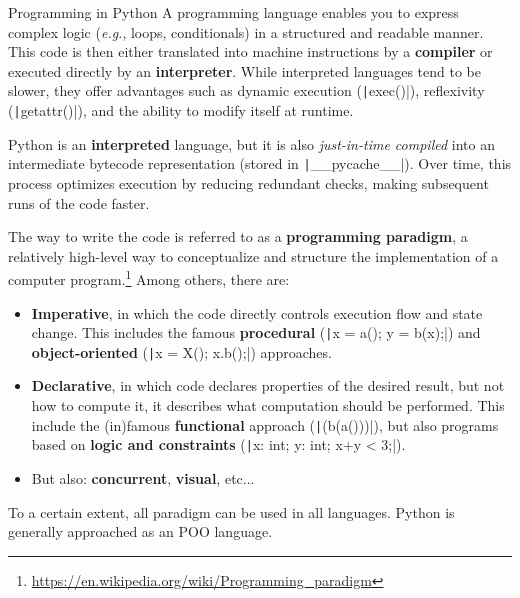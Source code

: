 \documentclass[10pt,
aspectratio=169
]{beamer}
\begin{document}
\begin{frame}{Programming in Python}
	A programming language enables you to express complex logic (\textit{e.g.}, loops, conditionals) in a structured and readable manner. This code is then either translated into machine instructions by a \textbf{compiler} or executed directly by an \textbf{interpreter}. While interpreted languages tend to be slower, they offer advantages such as dynamic execution (\texttt|exec()|), reflexivity (\texttt|getattr()|), and the ability to modify itself at runtime.
	
	Python is an \textbf{interpreted} language, but it is also \textit{just-in-time compiled} into an intermediate bytecode representation (stored in \texttt|__pycache__|). Over time, this process optimizes execution by reducing redundant checks, making subsequent runs of the code faster.
\end{frame}



\begin{frame}[fragile]
	The way to write the code is referred to as a \textbf{programming paradigm}, a relatively high-level way to conceptualize and structure the implementation of a computer program.\footnote{\url{https://en.wikipedia.org/wiki/Programming_paradigm}} Among others, there are:\begin{itemize}
		\item \textbf{Imperative}, in which the code directly controls execution flow and state change. This includes the famous \textbf{procedural} (\texttt|x = a(); y = b(x);|) and \textbf{object-oriented} (\texttt|x = X(); x.b();|) approaches.
		\item \textbf{Declarative}, in which code declares properties of the desired result, but not how to compute it, it describes what computation should be performed. This include the (in)famous \textbf{functional} approach (\texttt|(b(a()))|), but also programs based on \textbf{logic and constraints} (\texttt|x: int; y: int; x+y < 3;|).
		\item But also: \textbf{concurrent}, \textbf{visual}, etc...
	\end{itemize}
	
	To a certain extent, all paradigm can be used in all languages. Python is generally approached as an POO language.
	\vspace{1em}
\end{frame}
\end{document}
